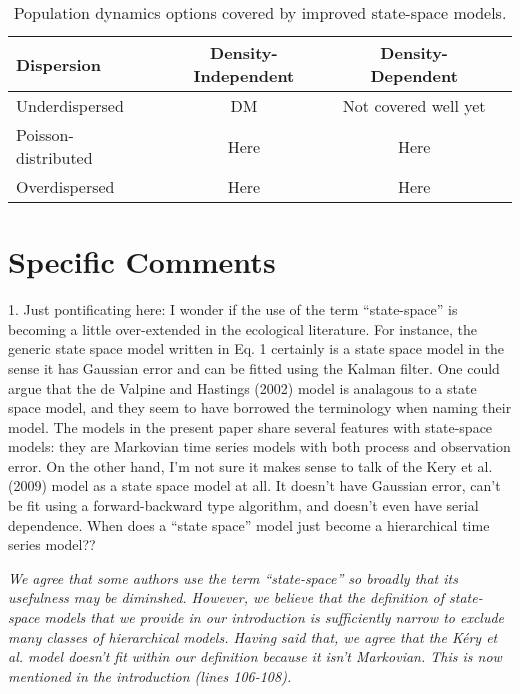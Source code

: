 \documentclass[12pt,english]{article}
\begin{document}
\begin{spacing}{1.9}
\begin{flushleft}
\begin{table}[t]
  \centering
\caption{Population dynamics options covered by improved state-space models.}  
\begin{tabular}{lccc}
    \hline
Dispersion & Density-Independent & Density-Dependent  \\    
\hline
    Underdispersed	        &DM	&Not covered well yet  \\
    Poisson-distributed	        &Here	&Here   \\
    Overdispersed		 &Here	&Here    \\
    \hline
  \end{tabular}
  \label{tab:cases}
\end{table}


\section*{Specific Comments}

1. Just pontificating here: I wonder if the use of the term ``state-space'' is becoming a little over-extended 
in the ecological literature. For instance, the generic state space model written in Eq. 1 certainly is a 
state space model in the sense it has Gaussian error and can be fitted using the Kalman filter. One could 
argue that the de Valpine and Hastings (2002) model is analagous to a state space model, and they seem 
to have borrowed the terminology when naming their model. The models in the present paper share 
several features with state-space models: they are Markovian time series models with both process and 
observation error. On the other hand, I'm not sure it makes sense to talk of the Kery et al. (2009) model 
as a state space model at all. It doesn't have Gaussian error, can't be fit using a forward-backward type 
algorithm, and doesn't even have serial dependence. When does a ``state space'' model just become a 
hierarchical time series model??

\vspace{0.5cm}
\textit{We agree that some authors use the term ``state-space'' so broadly that its usefulness may be diminshed. However, we believe that the definition of state-space models that we provide in our introduction is sufficiently narrow to exclude many classes of hierarchical models. Having said that, we agree that the K\'{e}ry et al. model doesn't fit within our definition because it isn't Markovian. This is now mentioned in the introduction (lines 106-108).}
\vspace{0.5cm}


\end{flushleft}
\end{spacing}
\end{document}
